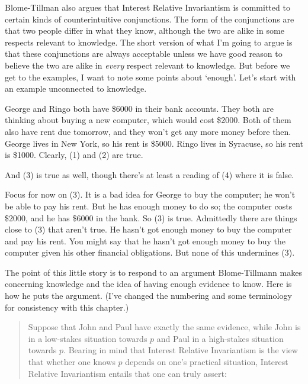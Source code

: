 Blome-Tillman also argues that Interest Relative Invariantism is committed to certain kinds of counterintuitive conjunctions. The form of the conjunctions are that two people differ in what they know, although the two are alike in some respects relevant to knowledge. The short version of what I'm going to argue is that these conjunctions are always acceptable unless we have good reason to believe the two are alike in \textit{every} respect relevant to knowledge. But before we get to the examples, I want to note some points about `enough'. Let's start with an example unconnected to knowledge.

\noindent George and Ringo both have \$6000 in their bank accounts. They both are thinking about buying a new computer, which would cost \$2000. Both of them also have rent due tomorrow, and they won't get any more money before then. George lives in New York, so his rent is \$5000. Ringo lives in Syracuse, so his rent is \$1000. Clearly, (1) and (2) are true.


\noindent And (3) is true as well, though there's at least a reading of (4) where it is false.


\noindent Focus for now on (3). It is a bad idea for George to buy the computer; he won't be able to pay his rent. But he has enough money to do so; the computer costs \$2000, and he has \$6000 in the bank. So (3) is true. Admittedly there are things close to (3) that aren't true. He hasn't got enough money to buy the computer and pay his rent. You might say that he hasn't got enough money to buy the computer given his other financial obligations. But none of this undermines (3). 

The point of this little story is to respond to an argument Blome-Tillmann \citeyearpar[??]{MBT2009} makes concerning knowledge and the idea of having enough evidence to know. Here is how he puts the argument. (I've changed the numbering and some terminology for consistency with this chapter.)

\begin{quote}
\noindent Suppose that John and Paul have exactly the same evidence, while John is in a low-stakes situation towards \(p\) and Paul in a high-stakes situation towards \(p\). Bearing in mind that Interest Relative Invariantism is the view that whether one knows \(p\) depends on one's practical situation, Interest Relative Invariantism entails that one can truly assert:

\end{quote}

